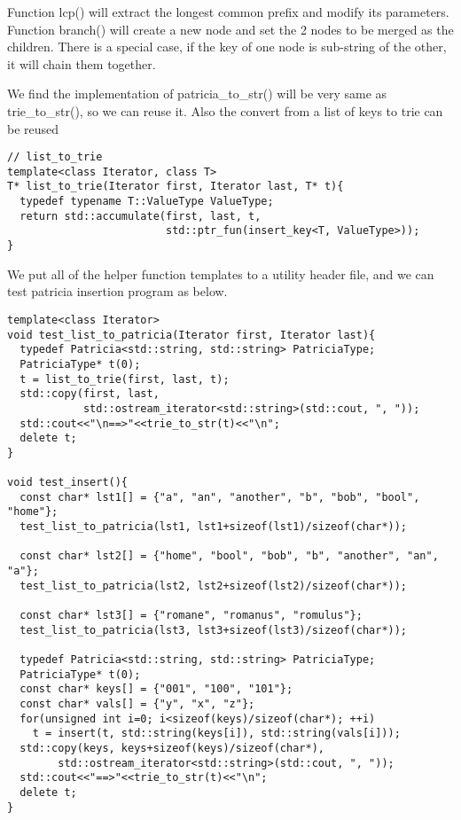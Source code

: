 \documentclass{article}
\begin{document}
Function lcp() will extract the longest common prefix and modify its
parameters. Function branch() will create a new node and set the 2
nodes to be merged as the children. There is a special case, if the
key of one node is sub-string of the other, it will chain them
together.

We find the implementation of patricia\_to\_str() will be very same
as trie\_to\_str(), so we can reuse it. Also the convert from a list
of keys to trie can be reused

\begin{lstlisting}
// list_to_trie
template<class Iterator, class T>
T* list_to_trie(Iterator first, Iterator last, T* t){
  typedef typename T::ValueType ValueType;
  return std::accumulate(first, last, t,
                         std::ptr_fun(insert_key<T, ValueType>));
}
\end{lstlisting}

We put all of the helper function templates to a utility header file,
and we can test patricia insertion program as below.

\begin{lstlisting}
template<class Iterator>
void test_list_to_patricia(Iterator first, Iterator last){
  typedef Patricia<std::string, std::string> PatriciaType;
  PatriciaType* t(0);
  t = list_to_trie(first, last, t);
  std::copy(first, last, 
            std::ostream_iterator<std::string>(std::cout, ", "));
  std::cout<<"\n==>"<<trie_to_str(t)<<"\n";
  delete t;
}

void test_insert(){
  const char* lst1[] = {"a", "an", "another", "b", "bob", "bool", "home"};
  test_list_to_patricia(lst1, lst1+sizeof(lst1)/sizeof(char*));

  const char* lst2[] = {"home", "bool", "bob", "b", "another", "an", "a"};
  test_list_to_patricia(lst2, lst2+sizeof(lst2)/sizeof(char*));

  const char* lst3[] = {"romane", "romanus", "romulus"};
  test_list_to_patricia(lst3, lst3+sizeof(lst3)/sizeof(char*));

  typedef Patricia<std::string, std::string> PatriciaType;
  PatriciaType* t(0);
  const char* keys[] = {"001", "100", "101"};
  const char* vals[] = {"y", "x", "z"};
  for(unsigned int i=0; i<sizeof(keys)/sizeof(char*); ++i)
    t = insert(t, std::string(keys[i]), std::string(vals[i]));
  std::copy(keys, keys+sizeof(keys)/sizeof(char*),
	    std::ostream_iterator<std::string>(std::cout, ", "));
  std::cout<<"==>"<<trie_to_str(t)<<"\n";
  delete t;
}
\end{lstlisting}
\end{document}
